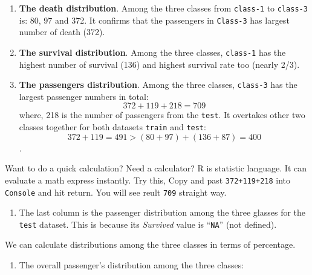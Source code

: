 \documentclass[
]{book}
\makeatletter
\newenvironment{Shaded}{\begin{snugshade}}{\end{snugshade}}
\newcommand{\CommentTok}[1]{\textcolor[rgb]{0.56,0.35,0.01}{\textit{#1}}}
\newcommand{\DataTypeTok}[1]{\textcolor[rgb]{0.13,0.29,0.53}{#1}}
\newcommand{\KeywordTok}[1]{\textcolor[rgb]{0.13,0.29,0.53}{\textbf{#1}}}
\newcommand{\NormalTok}[1]{#1}
\newcommand{\OperatorTok}[1]{\textcolor[rgb]{0.81,0.36,0.00}{\textbf{#1}}}
\newcommand{\StringTok}[1]{\textcolor[rgb]{0.31,0.60,0.02}{#1}}
\providecommand{\tightlist}{%
  \setlength{\itemsep}{0pt}\setlength{\parskip}{0pt}}
\newenvironment{kframe}{%
\medskip{}
\setlength{\fboxsep}{.8em}
 \def\at@end@of@kframe{}%
 \ifinner\ifhmode%
  \def\at@end@of@kframe{\end{minipage}}%
  \begin{minipage}{\columnwidth}%
 \fi\fi%
 \def\FrameCommand##1{\hskip\@totalleftmargin \hskip-\fboxsep
 \colorbox{shadecolor}{##1}\hskip-\fboxsep
     \hskip-\linewidth \hskip-\@totalleftmargin \hskip\columnwidth}%
 \MakeFramed {\advance\hsize-\width
   \@totalleftmargin\z@ \linewidth\hsize
   \@setminipage}}%
 {\par\unskip\endMakeFramed%
 \at@end@of@kframe}
\newenvironment{rmdblock}[1]
  {
  \begin{itemize}
  \renewcommand{\labelitemi}{
    \raisebox{-.7\height}[0pt][0pt]{
      {\setkeys{Gin}{width=3em,keepaspectratio}\texttt{[image: images/\#1]}}
    }
  }
  \setlength{\fboxsep}{1em}
  \begin{kframe}
  \item
  }
  {
  \end{kframe}
  \end{itemize}
  }
\newenvironment{rmdtip}
  {\begin{rmdblock}{tip}}
  {\end{rmdblock}}
\makeatother
\begin{document}
\begin{enumerate}
\def\labelenumi{\arabic{enumi}.}
\item
  \textbf{The death distribution}. Among the three classes from \texttt{class-1} to \texttt{class-3} is: 80, 97 and 372. It confirms that the passengers in \texttt{Class-3} has largest number of death (372).
\item
  \textbf{The survival distribution}. Among the three classes, \texttt{class-1} has the highest number of survival (136) and highest survival rate too (nearly 2/3).
\item
  \textbf{The passengers distribution}. Among the three classes, \texttt{class-3} has the largest passenger numbers in total: \[372+119+218 = 709\] where, 218 is the number of passengers from the \texttt{test}. It overtakes other two classes together for both datasets \texttt{train} and \texttt{test}: \[372+119 = 491 > (80+97) + (136+87)= 400\].
\end{enumerate}

\begin{rmdtip}
Want to do a quick calculation? Need a calculator? R is statistic language. It can evaluate a math express instantly. Try this, Copy and past \texttt{372+119+218} into \texttt{Console} and hit return. You will see reult \texttt{709} straight way.
\end{rmdtip}

\begin{enumerate}
\def\labelenumi{\arabic{enumi}.}
\setcounter{enumi}{3}
\tightlist
\item
  The last column is the passenger distribution among the three glasses for the \texttt{test} dataset. This is because its \emph{Survived} value is ``\texttt{NA}'' (not defined).
\end{enumerate}

We can calculate distributions among the three classes in terms of percentage.

\begin{enumerate}
\def\labelenumi{\arabic{enumi}.}
\tightlist
\item
  The overall passenger's distribution among the three classes:
\end{enumerate}

\begin{Shaded}
\end{Shaded}
\end{document}

